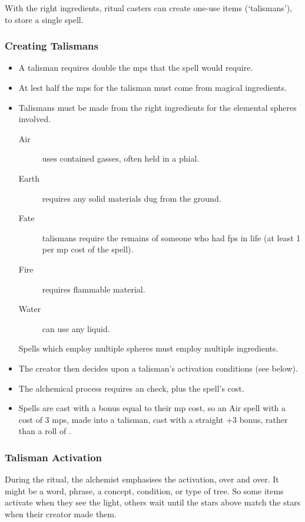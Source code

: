 \begin{multicols}{2}

\noindent
With the right ingredients, ritual casters
can create one-use items (`talismans'), to store a single spell.

\subsubsection{Creating Talismans}

\begin{itemize}
  \item
  A talisman requires double the \glspl{mp} that the spell would require.
  \item
  At lest half the \glspl{mp} for the talisman must come from magical ingredients.
  \item
  Talismans must be made from the right ingredients for the elemental spheres involved.
  \begin{description}
    \item[Air]
    uses contained gasses, often held in a phial.
    \item[Earth]
    requires any solid materials dug from the ground.
    \item[Fate]
    talismans require the remains of someone who had \glspl{fp} in life (at least 1 per \gls{mp} cost of the spell).
    \item[Fire]
    requires flammable material.
    \item[Water]
    can use any liquid.
  \end{description}
  Spells which employ multiple spheres must employ multiple ingredients.
  \item
  The creator then decides upon a talisman's activation conditions (see below).
  \item
  The alchemical process requires an  check, \tn[7] plus the spell's cost.
  \item
  Spells are cast with a bonus equal to their \gls{mp} cost, so an Air spell with a cost of 3 \glspl{mp}, made into a talisman, cast with a straight +3 bonus, rather than a roll of .
\end{itemize}

\subsubsection{Talisman Activation}

During the ritual, the alchemist emphasises the activation, over and over.
It might be a word, phrase, a concept, condition, or type of tree.
So some items activate when they see the light, others wait until the stars above match the stars when their creator made them.


\end{multicols}
